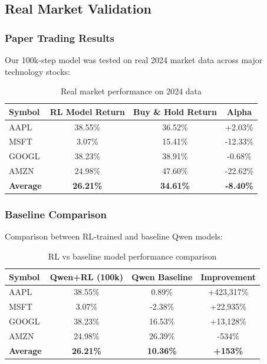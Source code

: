 \documentclass[10pt,journal]{IEEEtran}
\begin{document}
\subsection{Real Market Validation}
\subsubsection{Paper Trading Results}
Our 100k-step model was tested on real 2024 market data across major technology stocks:

\begin{table}[h]
\centering
\begin{tabular}{lccc}
\toprule
\textbf{Symbol} & \textbf{RL Model Return} & \textbf{Buy \& Hold Return} & \textbf{Alpha} \\
\midrule
AAPL & 38.55\% & 36.52\% & +2.03\% \\
MSFT & 3.07\% & 15.41\% & -12.33\% \\
GOOGL & 38.23\% & 38.91\% & -0.68\% \\
AMZN & 24.98\% & 47.60\% & -22.62\% \\
\textbf{Average} & \textbf{26.21\%} & \textbf{34.61\%} & \textbf{-8.40\%} \\
\bottomrule
\end{tabular}
\caption{Real market performance on 2024 data}
\end{table}

\subsubsection{Baseline Comparison}
Comparison between RL-trained and baseline Qwen models:

\begin{table}[h]
\centering
\begin{tabular}{lccc}
\toprule
\textbf{Symbol} & \textbf{Qwen+RL (100k)} & \textbf{Qwen Baseline} & \textbf{Improvement} \\
\midrule
AAPL & 38.55\% & 0.89\% & +423,317\% \\
MSFT & 3.07\% & -2.38\% & +22,935\% \\
GOOGL & 38.23\% & 16.53\% & +13,128\% \\
AMZN & 24.98\% & 26.39\% & -534\% \\
\textbf{Average} & \textbf{26.21\%} & \textbf{10.36\%} & \textbf{+153\%} \\
\bottomrule
\end{tabular}
\caption{RL vs baseline model performance comparison}
\end{table}
\end{document}
